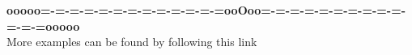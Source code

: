 \documentclass{ximera}
\begin{document}
\begin{center}
\textbf{\textcolor{green!50!black}{ooooo=-=-=-=-=-=-=-=-=-=-=-=-=ooOoo=-=-=-=-=-=-=-=-=-=-=-=-=ooooo}} \\

More examples can be found by following this link\\ 

\end{center}
\end{document}
